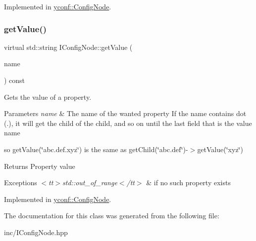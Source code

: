 Implemented in \hyperlink{classyconf_1_1ConfigNode_a4a1ed4e489687b3f1d4d514dbf57595d}{yconf\+::\+Config\+Node}.

\mbox{\label{classIConfigNode_ae32a49d812d3f98cbc048ab3cce5f7d6}} 
\subsubsection{\texorpdfstring{get\+Value()}{getValue()}}
{\footnotesize\ttfamily virtual std\+::string I\+Config\+Node\+::get\+Value (\begin{DoxyParamCaption}\item[{const std\+::string \&}]{name }\end{DoxyParamCaption}) const\hspace{0.3cm}{\ttfamily [pure virtual]}}



Gets the value of a property. 


\begin{DoxyParams}{Parameters}
{\em name} & The name of the wanted property If the name contains dot ({\ttfamily .}), it will get the child of the child, and so on until the last field that is the value name\\
\hline
\end{DoxyParams}
so {\ttfamily get\+Value(\char`\"{}abc.\+def.\+xyz\char`\"{})} is the same as {\ttfamily get\+Child(\char`\"{}abc.\+def\char`\"{})-\/$>$get\+Value(\char`\"{}xyz\char`\"{})}

\begin{DoxyReturn}{Returns}
Property value 
\end{DoxyReturn}

\begin{DoxyExceptions}{Exceptions}
{\em $<$tt$>$std\+::out\+\_\+of\+\_\+range$<$/tt$>$} & if no such property exists \\
\hline
\end{DoxyExceptions}


Implemented in \hyperlink{classyconf_1_1ConfigNode_a4670a614581800cfaef06670ad2a0276}{yconf\+::\+Config\+Node}.



The documentation for this class was generated from the following file\+:\begin{DoxyCompactItemize}
\item 
inc/I\+Config\+Node.\+hpp\end{DoxyCompactItemize}
